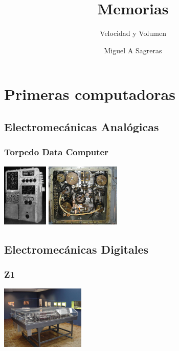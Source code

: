 \documentclass{beamer}
\title{Memorias}
\subtitle{Velocidad y Volumen}
\author[msagre]{Miguel A Sagreras}
\date[2015]{}
\begin{document}
\begin{frame}
\titlepage
\end{frame}

\section{Primeras computadoras}
\subsection{Electromecánicas Analógicas}
\begin{frame}
\frametitle{Torpedo Data Computer}
\begin{center}
\hfill
\includegraphics[height=3cm]{TDC-image.jpg}
\hfill
\includegraphics[height=3cm]{TDC-inside.jpg}
\end{center}
\end{frame}

\subsection{Electromecánicas Digitales}
\begin{frame}
\frametitle{Z1}
\begin{center}
\includegraphics[height=3cm]{Zuse_Z1-2.jpg}
\end{center}
\end{frame}
\end{document}
